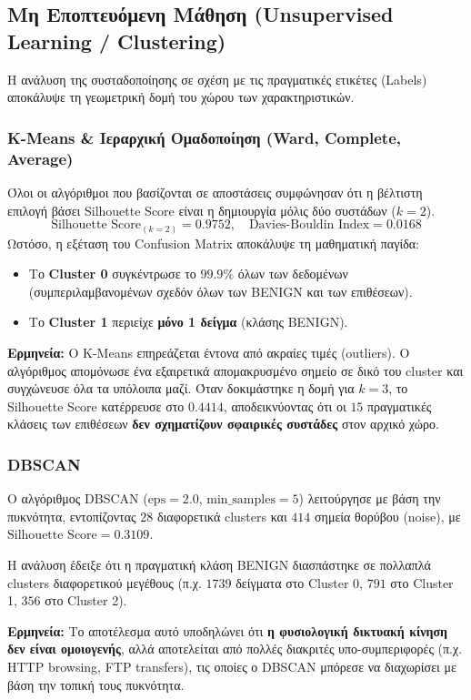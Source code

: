 \documentclass[11pt,a4paper]{article}
\begin{document}
	\subsection{Μη Εποπτευόμενη Μάθηση (Unsupervised Learning / Clustering)}
	Η ανάλυση της συσταδοποίησης σε σχέση με τις πραγματικές ετικέτες (Labels) αποκάλυψε τη γεωμετρική δομή του χώρου των χαρακτηριστικών.
	
	\subsubsection{K-Means \& Ιεραρχική Ομαδοποίηση (Ward, Complete, Average)}
	Όλοι οι αλγόριθμοι που βασίζονται σε αποστάσεις συμφώνησαν ότι η βέλτιστη επιλογή βάσει Silhouette Score είναι η δημιουργία μόλις δύο συστάδων ($k=2$).
	\begin{equation}
		\text{Silhouette Score}_{(k=2)} = 0.9752, \quad \text{Davies-Bouldin Index} = 0.0168
	\end{equation}
	Ωστόσο, η εξέταση του Confusion Matrix αποκάλυψε τη μαθηματική παγίδα:
	\begin{itemize}
		\item Το \textbf{Cluster 0} συγκέντρωσε το $99.9\%$ όλων των δεδομένων (συμπεριλαμβανομένων σχεδόν όλων των BENIGN και των επιθέσεων).
		\item Το \textbf{Cluster 1} περιείχε \textbf{μόνο 1 δείγμα} (κλάσης BENIGN).
	\end{itemize}
	\textbf{Ερμηνεία:} Ο K-Means επηρεάζεται έντονα από ακραίες τιμές (outliers). Ο αλγόριθμος απομόνωσε ένα εξαιρετικά απομακρυσμένο σημείο σε δικό του cluster και συγχώνευσε όλα τα υπόλοιπα μαζί. Όταν δοκιμάστηκε η δομή για $k=3$, το Silhouette Score κατέρρευσε στο $0.4414$, αποδεικνύοντας ότι οι $15$ πραγματικές κλάσεις των επιθέσεων \textbf{δεν σχηματίζουν σφαιρικές συστάδες} στον αρχικό χώρο.
	
	\subsubsection{DBSCAN}
	Ο αλγόριθμος DBSCAN ($\text{eps}=2.0$, $\text{min\_samples}=5$) λειτούργησε με βάση την πυκνότητα, εντοπίζοντας $28$ διαφορετικά clusters και $414$ σημεία θορύβου (noise), με $\text{Silhouette Score} = 0.3109$.
	
	Η ανάλυση έδειξε ότι η πραγματική κλάση BENIGN διασπάστηκε σε πολλαπλά clusters διαφορετικού μεγέθους (π.χ. $1739$ δείγματα στο Cluster 0, $791$ στο Cluster 1, $356$ στο Cluster 2). 
	
	\textbf{Ερμηνεία:} Το αποτέλεσμα αυτό υποδηλώνει ότι \textbf{η φυσιολογική δικτυακή κίνηση δεν είναι ομοιογενής}, αλλά αποτελείται από πολλές διακριτές υπο-συμπεριφορές (π.χ. HTTP browsing, FTP transfers), τις οποίες ο DBSCAN μπόρεσε να διαχωρίσει με βάση την τοπική τους πυκνότητα.
	
\end{document}
